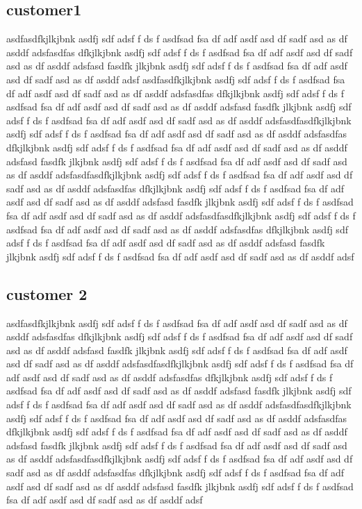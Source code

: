 \documentclass[11pt]{article}
\begin{document}
\subsection{ customer1 }
asdfasdfkjlkjbnk asdfj sdf adsf f ds f asdfsad fsa df adf asdf asd df sadf asd as df asddf adsfasdfas dfkjlkjbnk asdfj sdf adsf f ds f asdfsad fsa df adf asdf asd df sadf asd as df asddf adsfasd  fasdfk  jlkjbnk asdfj sdf adsf f ds f asdfsad fsa df adf asdf asd df sadf asd as df asddf adsf asdfasdfkjlkjbnk asdfj sdf adsf f ds f asdfsad fsa df adf asdf asd df sadf asd as df asddf adsfasdfas dfkjlkjbnk asdfj sdf adsf f ds f asdfsad fsa df adf asdf asd df sadf asd as df asddf adsfasd  fasdfk  jlkjbnk asdfj sdf adsf f ds f asdfsad fsa df adf asdf asd df sadf asd as df asddf adsfasdfasdfkjlkjbnk asdfj sdf adsf f ds f asdfsad fsa df adf asdf asd df sadf asd as df asddf adsfasdfas dfkjlkjbnk asdfj sdf adsf f ds f asdfsad fsa df adf asdf asd df sadf asd as df asddf adsfasd  fasdfk  jlkjbnk asdfj sdf adsf f ds f asdfsad fsa df adf asdf asd df sadf asd as df asddf adsfasdfasdfkjlkjbnk asdfj sdf adsf f ds f asdfsad fsa df adf asdf asd df sadf asd as df asddf adsfasdfas dfkjlkjbnk asdfj sdf adsf f ds f asdfsad fsa df adf asdf asd df sadf asd as df asddf adsfasd  fasdfk  jlkjbnk asdfj sdf adsf f ds f asdfsad fsa df adf asdf asd df sadf asd as df asddf adsfasdfasdfkjlkjbnk asdfj sdf adsf f ds f asdfsad fsa df adf asdf asd df sadf asd as df asddf adsfasdfas dfkjlkjbnk asdfj sdf adsf f ds f asdfsad fsa df adf asdf asd df sadf asd as df asddf adsfasd  fasdfk  jlkjbnk asdfj sdf adsf f ds f asdfsad fsa df adf asdf asd df sadf asd as df asddf adsf
\subsection{ customer 2 }
asdfasdfkjlkjbnk asdfj sdf adsf f ds f asdfsad fsa df adf asdf asd df sadf asd as df asddf adsfasdfas dfkjlkjbnk asdfj sdf adsf f ds f asdfsad fsa df adf asdf asd df sadf asd as df asddf adsfasd  fasdfk  jlkjbnk asdfj sdf adsf f ds f asdfsad fsa df adf asdf asd df sadf asd as df asddf adsfasdfasdfkjlkjbnk asdfj sdf adsf f ds f asdfsad fsa df adf asdf asd df sadf asd as df asddf adsfasdfas dfkjlkjbnk asdfj sdf adsf f ds f asdfsad fsa df adf asdf asd df sadf asd as df asddf adsfasd  fasdfk  jlkjbnk asdfj sdf adsf f ds f asdfsad fsa df adf asdf asd df sadf asd as df asddf adsfasdfasdfkjlkjbnk asdfj sdf adsf f ds f asdfsad fsa df adf asdf asd df sadf asd as df asddf adsfasdfas dfkjlkjbnk asdfj sdf adsf f ds f asdfsad fsa df adf asdf asd df sadf asd as df asddf adsfasd  fasdfk  jlkjbnk asdfj sdf adsf f ds f asdfsad fsa df adf asdf asd df sadf asd as df asddf adsfasdfasdfkjlkjbnk asdfj sdf adsf f ds f asdfsad fsa df adf asdf asd df sadf asd as df asddf adsfasdfas dfkjlkjbnk asdfj sdf adsf f ds f asdfsad fsa df adf asdf asd df sadf asd as df asddf adsfasd  fasdfk  jlkjbnk asdfj sdf adsf f ds f asdfsad fsa df adf asdf asd df sadf asd as df asddf adsf
\end{document}
